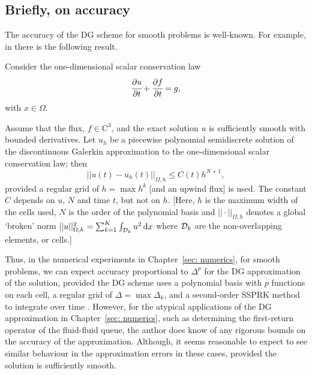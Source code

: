 \subsection{Briefly, on accuracy}
The accuracy of the DG scheme for smooth problems is well-known. For example, in \cite[Section~5.5]{nodalDGBook} there is the following result. 
\begin{thm}
	Consider the one-dimensional scalar conservation law 
	\begin{align*}
		\cfrac{\partial u}{\partial t}+\cfrac{\partial f}{\partial t}=g,
	\end{align*}
	with \(x \in\Omega \).

	Assume that the flux, \(f\in \mathrm{C}^3\), and the exact solution \(u\) is sufficiently smooth with bounded derivatives. Let \(u_h\) be a piecewise polynomial semidiscrete solution of the discontinuous Galerkin approximation to the one-dimensional scalar conservation law; then 
	\[|| u(t)-u_h(t)||_{\Omega,h}\leq C(t)h^{N+1},\]
	provided a regular grid of \(h=\max h^k\) [and an upwind flux] is used. The constant \(C\) depends on \(u,\, N\) and time \(t\), but not on \(h\). [Here, \(h\) is the maximum width of the cells used, \(N\) is the order of the polynomial basis and \(||\cdot||_{\Omega,h}\) denotes a global `broken' norm \(||u||^2_{\Omega,h}=\sum_{k=1}^K\int_{\mathcal{D}_k} u^2 \, \mathrm{d} x\) where \(\mathcal{D}_k\) are the non-overlapping elements, or cells.]
\end{thm}


Thus, in the numerical experiments in Chapter~\ref{sec: numerics}, for smooth problems, we can expect accuracy proportional to \(\Delta^{p}\) for the DG approximation of the solution, provided the DG scheme uses a polynomial basis with \(p\) functions on each cell, a regular grid of \(\Delta = \max \Delta_k\), and a second-order SSPRK method to integrate over time \citep[Sections~5.5,~5.8, and references therein]{nodalDGBook}. However, for the atypical applications of the DG approximation in Chapter~\ref{sec: numerics}, such as determining the first-return operator of the fluid-fluid queue, the author does know of any rigorous bounds on the accuracy of the approximation. Although, it seems reasonable to expect to see similar behaviour in the approximation errors in these cases, provided the solution is sufficiently smooth. 

